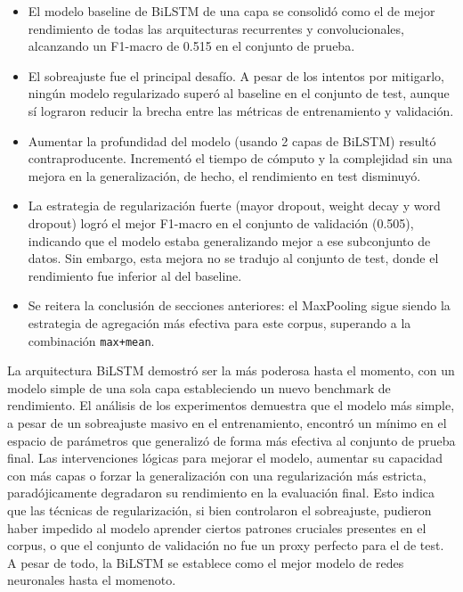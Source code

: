 \begin{itemize}
    \item El modelo baseline de BiLSTM de una capa se consolidó como el de mejor rendimiento de todas las arquitecturas recurrentes y convolucionales, 
    alcanzando un F1-macro de 0.515 en el conjunto de prueba.
    \item El sobreajuste fue el principal desafío. A pesar de los intentos por mitigarlo, ningún modelo regularizado superó al baseline en el conjunto de test,
    aunque sí lograron reducir la brecha entre las métricas de entrenamiento y validación.
    \item Aumentar la profundidad del modelo (usando 2 capas de BiLSTM) resultó contraproducente. Incrementó el tiempo de cómputo y la complejidad sin una
    mejora en la generalización, de hecho, el rendimiento en test disminuyó.
    \item La estrategia de regularización fuerte (mayor dropout, weight decay y word dropout) logró el mejor F1-macro en el conjunto de validación
    (0.505), indicando que el modelo estaba generalizando mejor a ese subconjunto de datos. Sin embargo, esta mejora no se tradujo al conjunto de test, donde el
    rendimiento fue inferior al del baseline.
    \item Se reitera la conclusión de secciones anteriores: el MaxPooling sigue siendo la estrategia de agregación más efectiva para este corpus,
    superando a la combinación \texttt{max+mean}.
\end{itemize}

La arquitectura BiLSTM demostró ser la más poderosa hasta el momento, con un modelo simple de una sola capa estableciendo un nuevo benchmark de rendimiento.
El análisis de los experimentos demuestra que el modelo más simple, a pesar de un sobreajuste masivo en el entrenamiento, encontró 
un mínimo en el espacio de parámetros que generalizó de forma más efectiva al conjunto de prueba final. Las intervenciones lógicas para mejorar el modelo, aumentar 
su capacidad con más capas o forzar la generalización con una regularización más estricta, paradójicamente degradaron su rendimiento en la evaluación final. 
Esto indica que las técnicas de regularización, si bien controlaron el sobreajuste, pudieron haber impedido al modelo aprender ciertos patrones cruciales 
presentes en el corpus, o que el conjunto de validación no fue un proxy perfecto para el de test. A pesar de todo, la BiLSTM se establece como el mejor modelo
de redes neuronales hasta el momenoto.

